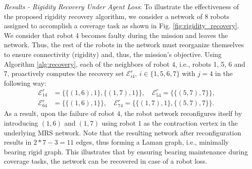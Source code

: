 \textit{Results - Rigidity Recovery Under Agent Loss}: To illustrate the effectiveness of the proposed rigidity recovery algorithm, we consider a network of $8$ robots assigned to accomplish a coverage task as shown in Fig. \ref{fig:rigidity_recovery}. We consider that robot $4$ becomes faulty during the mission and leaves the network. Thus, the rest of the robots in the network must reorganize themselves to ensure connectivity (rigidity) and, thus, the mission's objective. Using Algorithm \ref{alg:recovery}, each of the neighbors of robot $4$, i.e., robots 1, 5, 6 and 7, proactively computes the recovery set $\mathcal{E}^r_{i4}, \ i\in\{1,5,6,7\}$ with $j=4$ in the following way:
\begin{align*}
    \mathcal{E}^r_{14} &= \big\{\{(1,6), 1\}, \{(1,7), 1\}\big\}, \quad \mathcal{E}^r_{54} = \big\{\{(5,7), 7\}\big\}, \\
    \mathcal{E}^r_{64} &= \big\{\{(1,6), 1\} \big\}, \quad \mathcal{E}^r_{74} = \big\{\{(1,7), 1\}, \{(5,7), 7\}\big\}.
\end{align*}
As a result, upon the failure of robot $4$, the robot network reconfigures itself by introducing $(1,6)$ and $(1,7)$ using robot $1$ as the contraction vertex in the underlying MRS network. Note that the resulting network after reconfiguration results in $2*7-3 = 11$ edges, thus forming a Laman graph, i.e., minimally bearing rigid graph. This illustrates that by ensuring bearing maintenance during coverage tasks, the network can be recovered in case of a robot loss. 


